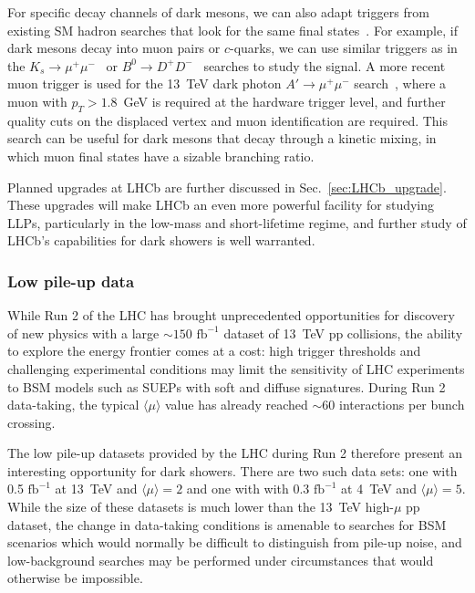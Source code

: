 For specific decay channels of dark mesons, we can also adapt triggers from existing SM hadron searches that look for the same  final states~\cite{Pierce:2017taw}. For example, if dark mesons decay into muon pairs or $c$-quarks, we can use similar triggers as in the $K_s\to\mu^+\mu^-$~\cite{Aaij:2012rt} or $B^0\to D^+D^-$~\cite{Aaij:2016yip} searches to study the signal. A more recent muon trigger is used for the 13~TeV dark photon $A'\to\mu^+\mu^-$ search~\cite{Aaij:2017rft}, where a muon with $p_T>1.8$~GeV is required at the hardware trigger level, and further quality cuts on the displaced vertex and muon identification are required. This search can be useful for dark mesons that decay through a kinetic mixing, in which muon final states have a sizable branching ratio.

Planned upgrades at LHCb are further discussed in Sec.~\ref{sec:LHCb_upgrade}. These upgrades will make LHCb an even more powerful facility for studying LLPs, particularly in the low-mass and short-lifetime regime, and further study of LHCb's capabilities for dark showers is well warranted.

\subsubsection{Low pile-up data}

While Run 2 of the LHC has brought unprecedented opportunities for discovery of new physics with a large $\sim150\,\,\mathrm{fb}^{-1}$ dataset of 13~TeV pp collisions, the ability to explore the energy frontier comes at a cost: high trigger thresholds and challenging experimental conditions may limit the sensitivity of LHC experiments to BSM models such as SUEPs with soft and diffuse signatures. During Run 2 data-taking, the typical $\langle \mu\rangle$ value has already reached $\sim60$ interactions per bunch crossing.

The low pile-up datasets provided by the LHC during Run 2 therefore present an interesting opportunity for dark showers. There are two such data sets: one with 0.5 $\text{fb}^{-1}$ at 13~TeV and  $\langle\mu\rangle=2$ and one with with 0.3 $\text{fb}^{-1}$ at 4~TeV and $\langle\mu\rangle=5$. While the size of these datasets is much lower than the 13~TeV high-$\mu$ pp dataset, the change in data-taking conditions is amenable to searches for BSM scenarios which would normally be difficult to distinguish from pile-up noise, and low-background searches may be performed under circumstances that would otherwise be impossible.

